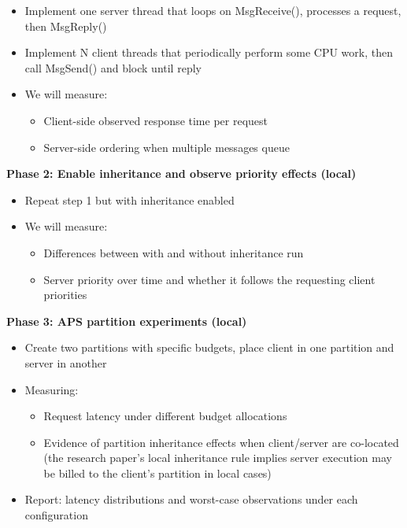 \documentclass[11pt]{article}
\begin{document}
\begin{itemize}
\item Implement one server thread that loops on MsgReceive(), processes a request, then MsgReply()
\item Implement N client threads that periodically perform some CPU work, then call MsgSend() and block until reply
\item We will measure:
\begin{itemize}
\item Client-side observed response time per request
\item Server-side ordering when multiple messages queue
\end{itemize}
\end{itemize}

\noindent\textbf{Phase 2: Enable inheritance and observe priority effects (local)}

\begin{itemize}
\item Repeat step 1 but with inheritance enabled
\item We will measure:
\begin{itemize}
\item Differences between with and without inheritance run
\item Server priority over time and whether it follows the requesting client priorities
\end{itemize}
\end{itemize}

\noindent\textbf{Phase 3: APS partition experiments (local)}

\begin{itemize}
\item Create two partitions with specific budgets, place client in one partition and server in another
\item Measuring:
\begin{itemize}
\item Request latency under different budget allocations
\item Evidence of partition inheritance effects when client/server are co-located (the research paper's local inheritance rule implies server execution may be billed to the client's partition in local cases)
\end{itemize}
\item Report: latency distributions and worst-case observations under each configuration
\end{itemize}
\end{document}
